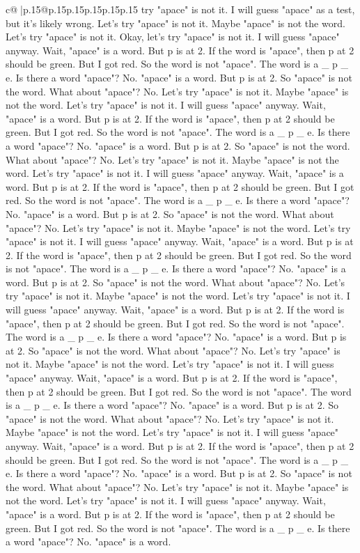 \documentclass{article}
\begin{document}
{\begin{supertabular}{c@{$\;$}|p{.15\linewidth}@{}p{.15\linewidth}p{.15\linewidth}p{.15\linewidth}p{.15\linewidth}p{.15\linewidth}}
{{{try "apace" is not it. I will guess "apace" as a test, but it's likely wrong. Let's try "apace" is not it. Maybe "apace" is not the word. Let's try "apace" is not it. Okay, let's try "apace" is not it. I will guess "apace" anyway. Wait, "apace" is a word. But p is at 2. If the word is "apace", then p at 2 should be green. But I got red. So the word is not "apace". The word is a \_ p \_ e. Is there a word "apace"? No. "apace" is a word. But p is at 2. So "apace" is not the word. What about "apace"? No. Let's try "apace" is not it. Maybe "apace" is not the word. Let's try "apace" is not it. I will guess "apace" anyway. Wait, "apace" is a word. But p is at 2. If the word is "apace", then p at 2 should be green. But I got red. So the word is not "apace". The word is a \_ p \_ e. Is there a word "apace"? No. "apace" is a word. But p is at 2. So "apace" is not the word. What about "apace"? No. Let's try "apace" is not it. Maybe "apace" is not the word. Let's try "apace" is not it. I will guess "apace" anyway. Wait, "apace" is a word. But p is at 2. If the word is "apace", then p at 2 should be green. But I got red. So the word is not "apace". The word is a \_ p \_ e. Is there a word "apace"? No. "apace" is a word. But p is at 2. So "apace" is not the word. What about "apace"? No. Let's try "apace" is not it. Maybe "apace" is not the word. Let's try "apace" is not it. I will guess "apace" anyway. Wait, "apace" is a word. But p is at 2. If the word is "apace", then p at 2 should be green. But I got red. So the word is not "apace". The word is a \_ p \_ e. Is there a word "apace"? No. "apace" is a word. But p is at 2. So "apace" is not the word. What about "apace"? No. Let's try "apace" is not it. Maybe "apace" is not the word. Let's try "apace" is not it. I will guess "apace" anyway. Wait, "apace" is a word. But p is at 2. If the word is "apace", then p at 2 should be green. But I got red. So the word is not "apace". The word is a \_ p \_ e. Is there a word "apace"? No. "apace" is a word. But p is at 2. So "apace" is not the word. What about "apace"? No. Let's try "apace" is not it. Maybe "apace" is not the word. Let's try "apace" is not it. I will guess "apace" anyway. Wait, "apace" is a word. But p is at 2. If the word is "apace", then p at 2 should be green. But I got red. So the word is not "apace". The word is a \_ p \_ e. Is there a word "apace"? No. "apace" is a word. But p is at 2. So "apace" is not the word. What about "apace"? No. Let's try "apace" is not it. Maybe "apace" is not the word. Let's try "apace" is not it. I will guess "apace" anyway. Wait, "apace" is a word. But p is at 2. If the word is "apace", then p at 2 should be green. But I got red. So the word is not "apace". The word is a \_ p \_ e. Is there a word "apace"? No. "apace" is a word. But p is at 2. So "apace" is not the word. What about "apace"? No. Let's try "apace" is not it. Maybe "apace" is not the word. Let's try "apace" is not it. I will guess "apace" anyway. Wait, "apace" is a word. But p is at 2. If the word is "apace", then p at 2 should be green. But I got red. So the word is not "apace". The word is a \_ p \_ e. Is there a word "apace"? No. "apace" is a word. }}}
\end{supertabular}}
\end{document}
